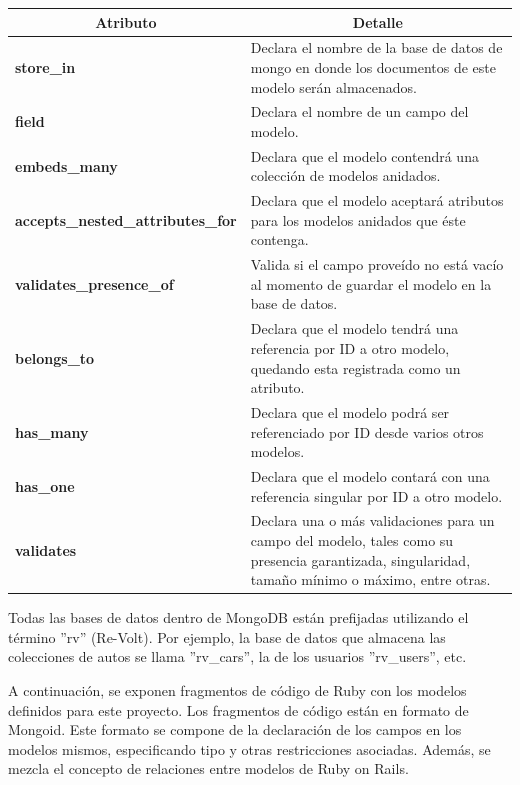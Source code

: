 \begin{center}
  \begin{tabular}{ | p{6cm} | p{9cm} |}
    \hline
    \multicolumn{1}{|c|}{\textbf{Atributo}} & \multicolumn{1}{|c|}{\textbf{Detalle}} \\
    \hline
    
    {\textbf{store\_in}} & Declara el nombre de la base de datos de mongo en donde los documentos de este modelo serán almacenados.\\ \hline
    {\textbf{field}} & Declara el nombre de un campo del modelo. \\ \hline
    {\textbf{embeds\_many}} & Declara que el modelo contendrá una colección de modelos anidados. \\ \hline
    {\textbf{accepts\_nested\_attributes\_for}} & Declara que el modelo aceptará atributos para los modelos anidados que éste contenga. \\ \hline
    {\textbf{validates\_presence\_of}} & Valida si el campo proveído no está vacío al momento de guardar el modelo en la base de datos. \\ \hline
    {\textbf{belongs\_to}} & Declara que el modelo tendrá una referencia por ID a otro modelo, quedando esta registrada como un atributo.
    \\ \hline
    {\textbf{has\_many}} & Declara que el modelo podrá ser referenciado por ID desde varios otros modelos. \\ \hline
    {\textbf{has\_one}} & Declara que el modelo contará con una referencia singular por ID a otro modelo. \\ \hline
    {\textbf{validates}} & Declara una o más validaciones para un campo del modelo, tales como su presencia garantizada, singularidad, tamaño mínimo o máximo, entre otras.\\ \hline
  \end{tabular}
  
  \label{table:schema}
\end{center}

Todas las bases de datos dentro de MongoDB están prefijadas utilizando el término ''rv'' (Re-Volt). Por ejemplo, la base de datos que almacena las colecciones de autos se llama ''rv\_cars'', la de los usuarios ''rv\_users'', etc.

A continuación, se exponen fragmentos de código de Ruby con los modelos definidos para este proyecto. Los fragmentos de código están en formato de Mongoid. Este formato se compone de la declaración de los campos en los modelos mismos, especificando tipo y otras restricciones asociadas. Además, se mezcla el concepto de relaciones entre modelos de Ruby on Rails.

